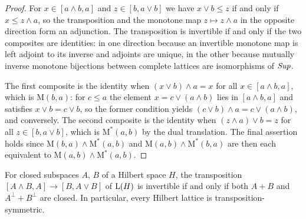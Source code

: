 \begin{proof}
  
  \leanok
  For \(x\in[a\wedge b,a]\) and \(z\in[b,a\vee b]\) we have \(x\vee b\leq z\) if and only if \(x\leq z\wedge a\), so the transposition and the monotone map \(z\mapsto z\wedge a\) in the opposite direction form an adjunction. The transposition is invertible if and only if the two composites are identities: in one direction because an invertible monotone map is left adjoint to its inverse and adjoints are unique, in the other because mutually inverse monotone bijections between complete lattices are isomorphisms of \(\mathit{Sup}\).

	The first composite is the identity when \((x\vee b)\wedge a=x\) for all \(x\in[a\wedge b,a]\), which is \(\mathrm{M}(b,a)\): for \(c\leq a\) the element \(x=c\vee(a\wedge b)\) lies in \([a\wedge b,a]\) and satisfies \(x\vee b=c\vee b\), so the former condition yields \((c\vee b)\wedge a=c\vee(a\wedge b)\), and conversely. The second composite is the identity when \((z\wedge a)\vee b=z\) for all \(z\in[b,a\vee b]\), which is \(\mathrm{M}^{*}(a,b)\) by the dual translation. The final assertion holds since \(\mathrm{M}(b,a)\wedge\mathrm{M}^{*}(a,b)\) and \(\mathrm{M}(a,b)\wedge\mathrm{M}^{*}(b,a)\) are then each equivalent to \(\mathrm{M}(a,b)\wedge\mathrm{M}^{*}(a,b)\).
\end{proof}

\begin{proposition}
  \label{P:HilbertSymmetric}  \leanok
  For closed subspaces \(A\), \(B\) of a Hilbert space \(H\), the transposition \([A\wedge B,A]\to[B,A\vee B]\) of \(\mathrm{L}(H)\) is invertible if and only if both \(A+B\) and \(A^{\perp}+B^{\perp}\) are closed. In particular, every Hilbert lattice is transposition-symmetric.
\end{proposition}

